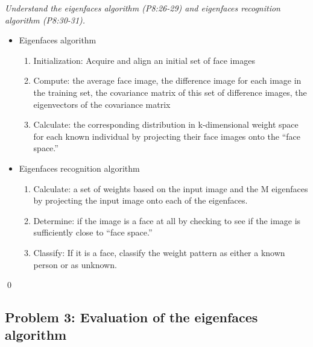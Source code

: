 \documentclass[
        ]{beamer}
\begin{document}
\begin{frame}[t]{\subsecname}
	\begin{overprint}
	\emph{Understand the eigenfaces algorithm (P8:26-29) and eigenfaces recognition algorithm (P8:30-31).}
		\onslide<2> 
		\onslide<3> 
		\onslide<4> 
		\onslide<5> 
		\onslide<6> 
		\onslide<7>  
		\onslide<8>  
		\begin{itemize}
			\item Eigenfaces algorithm   				
			\begin{enumerate}
					\item Initialization: Acquire and align an initial set of face images
					\item Compute: the average face image, the difference image for each image in the training set, the covariance matrix of this set of difference images, the eigenvectors of the covariance matrix
					\item Calculate: the corresponding distribution in k-dimensional weight space for each known individual by projecting their face images onto the ``face space.''
				\end{enumerate}
		\end{itemize}
		\begin{itemize}
				\item Eigenfaces recognition algorithm			
			\begin{enumerate}
					\item Calculate: a set of weights based on the input image and the M eigenfaces by projecting the input image onto each of the eigenfaces.
					\item Determine: if the image is a face at all by checking to see if the image is sufficiently close to ``face space.''
					\item Classify: If it is a face, classify the weight pattern as either a known person or as unknown.
				\end{enumerate}
		\end{itemize}\qed
	\end{overprint}
\end{frame}
		
\subsection{Problem 3: Evaluation of the eigenfaces algorithm}
\end{document}
